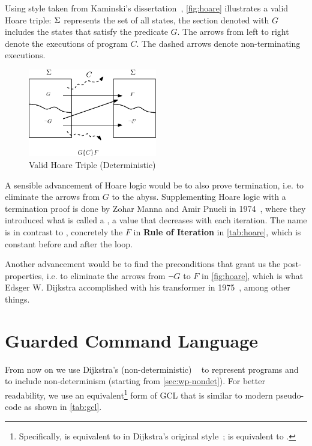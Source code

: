 Using style taken from Kaminski's dissertation~\cite{kaminski19}, \autoref{fig:hoare} illustrates a valid Hoare triple: $\S$ represents the set of all states, the section denoted with $G$ includes the states that satisfy the predicate $G$. 
The arrows from left to right denote the executions of program $C$. 
The dashed arrows denote non-terminating executions. 

\begin{figure}[ht!]\centering
\includegraphics[width=0.5\textwidth]{image/hoare.eps}
\caption{Valid Hoare Triple (Deterministic)}
\label{fig:hoare}
\end{figure}


A sensible advancement of Hoare logic would be to also prove termination, i.e. to eliminate the arrows from $G$ to the abyss.  
Supplementing Hoare logic with a termination proof is done by Zohar Manna and Amir Pnueli in 1974~\cite{manna74}, where they introduced what is called a , a value that decreases with each iteration. The name is in contrast to , concretely the $F$ in \textbf{Rule of Iteration} in \autoref{tab:hoare}, which is constant before and after the loop. 

Another advancement would be to find the  preconditions that grant us the post-properties, i.e. to eliminate the arrows from $\neg G$ to $F$ in \autoref{fig:hoare}, which  is what Edsger W. Dijkstra accomplished with his  transformer in 1975~\cite{dijkstra75}, among other things. 


\section{Guarded Command Language}\label{sec:gcl}
From now on we use Dijkstra's (non-deterministic) ~\cite{dijkstra75} to represent programs and to include non-determinism (starting from \autoref{sec:wp-nondet}).
For better readability, we use an equivalent\footnote{Specifically,   is equivalent to
 in Dijkstra's original style~\cite{dijkstra75};  is equivalent to .} 
form of GCL that is similar to modern pseudo-code as shown in \autoref{tab:gcl}. 


